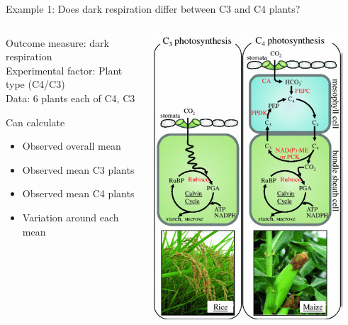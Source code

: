 \documentclass{beamer}
\begin{document}
\begin{frame}{Example 1: Does dark respiration differ between C3 and C4 plants?}

\begin{columns}
 \begin{column}{0.6\textwidth}
  Outcome measure: dark respiration\\
  Experimental factor: Plant type (C4/C3)\\
  Data: 6 plants each of C4, C3

  \begin{block}{Can calculate}
 \begin{itemize}
  \item Observed overall mean
  \item Observed mean C3 plants
  \item Observed mean C4 plants
  \item Variation around each mean
 \end{itemize}
\end{block}
  \end{column}
  \begin{column}{0.4\textwidth}
   \includegraphics[width=0.9\textwidth]{Figures/c34}
  \end{column}

\end{columns}


\end{frame}
\end{document}

